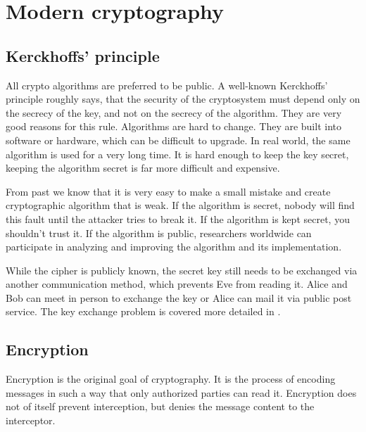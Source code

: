 \chapter{Modern cryptography}

\section{Kerckhoffs' principle}

All crypto algorithms are preferred to be public. A well-known Kerckhoffs' principle roughly says, that the security of the cryptosystem must depend only on the secrecy of the key, and not on the secrecy of the algorithm. They are very good reasons for this rule. Algorithms are hard to change. They are built into software or hardware, which can be difficult to upgrade. In real world, the same algorithm is used for a very long time. It is hard enough to keep the key secret, keeping the algorithm secret is far more difficult and expensive.

From past we know that it is very easy to make a small mistake and create cryptographic algorithm that is weak. If the algorithm is secret, nobody will find this fault until the attacker tries to break it. If the algorithm is kept secret, you shouldn't trust it. If the algorithm is public, researchers worldwide can participate in analyzing and improving the algorithm and its implementation.

While the cipher is publicly known, the secret key still needs to be exchanged via another communication method, which prevents Eve from reading it. Alice and Bob can meet in person to exchange the key or Alice can mail it via public post service. The key exchange problem is covered more detailed in .

\section{Encryption}
\label{toc/encryption}

Encryption is the original goal of cryptography. It is the process of encoding messages in such a way that only authorized parties can read it. Encryption does not of itself prevent interception, but denies the message content to the interceptor.

